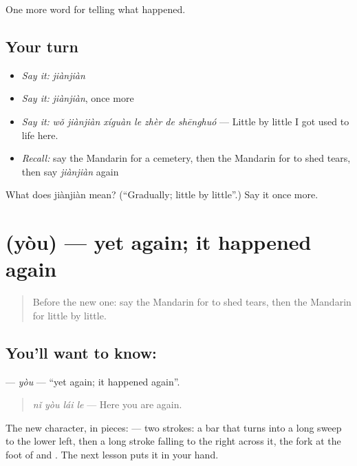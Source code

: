 \begin{grammarlens}[title={What you've built}]
One more word for telling what happened.
\end{grammarlens}

\subsection*{Your turn}
\begin{itemize}
\raggedright
  \item \emph{Say it:} \emph{jiànjiàn}
  \item \emph{Say it:} \emph{jiànjiàn}, once more
  \item \emph{Say it:} \emph{wǒ jiànjiàn xíguàn le zhèr de shēnghuó} — Little by little I got used to life here.
  \item \emph{Recall:} say the Mandarin for a cemetery, then the Mandarin for to shed tears, then say \emph{jiànjiàn} again
\end{itemize}

\begin{tcolorbox}[breakable,colback=teal!4,colframe=teal!35!black,title={Before you move on}]
What does jiànjiàn mean? (\textquotedblleft{}Gradually; little by little\textquotedblright{}.) Say it once more.
\end{tcolorbox}
\section[\texorpdfstring{\zh{又} (yòu)}{又 (yòu)}]{ (yòu) — yet again; it happened again}

\label{lesson:ZH-C315-you}



\begin{quote}
Before the new one: say the Mandarin for to shed tears, then the Mandarin for little by little.
\end{quote}

\subsection*{You'll want to know: }
\textbf{} — \emph{yòu} — \textquotedblleft{}yet again; it happened again\textquotedblright{}.

\begin{quote}
\textbf{} \emph{nǐ yòu lái le} — Here you are again.
\end{quote}

The new character, in pieces:  — two strokes: a bar that turns into a long sweep to the lower left, then a long stroke falling to the right across it, the fork at the foot of  and . The next lesson puts it in your hand.

